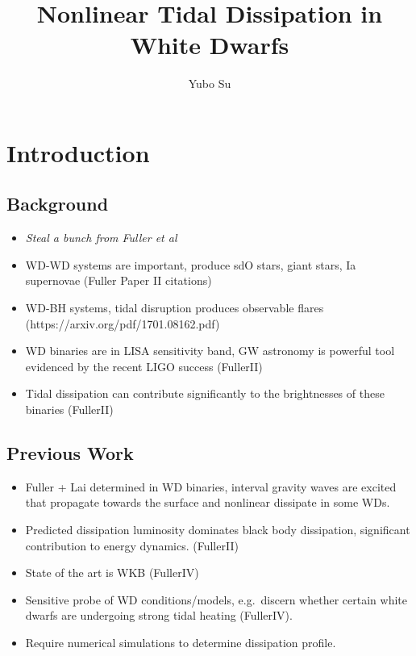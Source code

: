 \documentclass[11pt,
        usenames, %
        dvipsnames %
    ]{article}
\begin{document}
\newpage

\title{Nonlinear Tidal Dissipation in White Dwarfs}
\author{Yubo Su}
\date{}

\maketitle

\section{Introduction}

\subsection{Background}

\begin{itemize}
    \item \emph{Steal a bunch from Fuller et al}
    \item WD-WD systems are important, produce sdO stars, giant stars,
        Ia supernovae (Fuller Paper II citations)
    \item WD-BH systems, tidal disruption produces observable flares
        (https://arxiv.org/pdf/1701.08162.pdf)
    \item WD binaries are in LISA sensitivity band, GW astronomy is powerful
        tool evidenced by the recent LIGO success (FullerII)
    \item Tidal dissipation can contribute significantly to the brightnesses of
        these binaries (FullerII)
\end{itemize}

\subsection{Previous Work}

\begin{itemize}
    \item Fuller + Lai determined in WD binaries, interval gravity waves are
        excited that propagate towards the surface and nonlinear dissipate in
        some WDs.
    \item Predicted dissipation luminosity dominates black body dissipation,
        significant contribution to energy dynamics. (FullerII)
    \item State of the art is WKB (FullerIV)
    \item Sensitive probe of WD conditions/models, e.g.\ discern whether certain
        white dwarfs are undergoing strong tidal heating (FullerIV).
    \item Require numerical simulations to determine dissipation profile.
\end{itemize}
\end{document}
